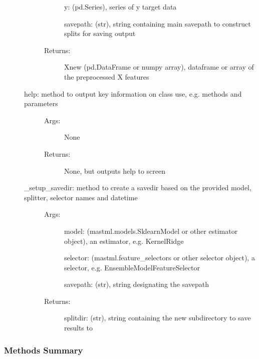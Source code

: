 \documentclass[letterpaper,10pt,english]{sphinxmanual}
\begin{document}
\begin{fulllineitems}
\begin{description}
\begin{description}
\begin{description}
y: (pd.Series), series of y target data

savepath: (str), string containing main savepath to construct splits for saving output

\item[{Returns:}] \leavevmode
Xnew (pd.DataFrame or numpy array), dataframe or array of the preprocessed X features

\end{description}

\item[{help: method to output key information on class use, e.g. methods and parameters}] \leavevmode\begin{description}
\item[{Args:}] \leavevmode
None

\item[{Returns:}] \leavevmode
None, but outputs help to screen

\end{description}

\item[{\_setup\_savedir: method to create a savedir based on the provided model, splitter, selector names and datetime}] \leavevmode\begin{description}
\item[{Args:}] \leavevmode
model: (mastml.models.SklearnModel or other estimator object), an estimator, e.g. KernelRidge

selector: (mastml.feature\_selectors or other selector object), a selector, e.g. EnsembleModelFeatureSelector

savepath: (str), string designating the savepath

\item[{Returns:}] \leavevmode
splitdir: (str), string containing the new subdirectory to save results to

\end{description}

\end{description}

\end{description}
\subsubsection*{Methods Summary}


\begin{savenotes}\sphinxatlongtablestart\begin{longtable}[c]{}
\hline


\end{longtable}
\end{savenotes}
\end{fulllineitems}
\end{document}
